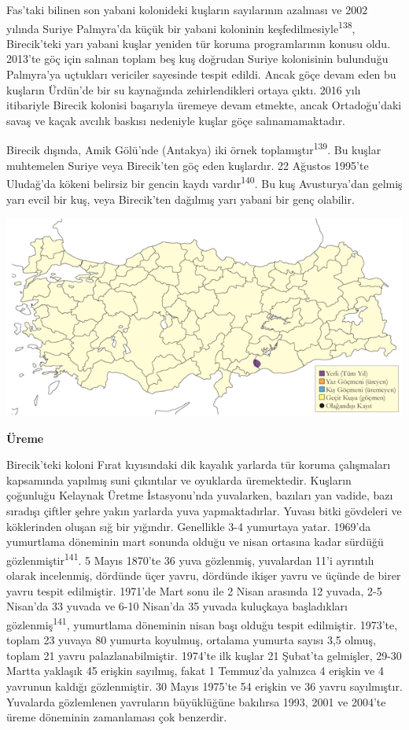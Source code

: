 \documentclass[
  letterpaper,
  DIV=11,
  numbers=noendperiod]{scrreprt}
\begin{document}
Fas'taki bilinen son yabani kolonideki kuşların sayılarının azalması ve
2002 yılında Suriye Palmyra'da küçük bir yabani koloninin
keşfedilmesiyle\textsuperscript{138}, Birecik'teki yarı yabani kuşlar
yeniden tür koruma programlarının konusu oldu. 2013'te göç için salınan
toplam beş kuş doğrudan Suriye kolonisinin bulunduğu Palmyra'ya
uçtukları vericiler sayesinde tespit edildi. Ancak göçe devam eden bu
kuşların Ürdün'de bir su kaynağında zehirlendikleri ortaya çıktı. 2016
yılı itibariyle Birecik kolonisi başarıyla üremeye devam etmekte, ancak
Ortadoğu'daki savaş ve kaçak avcılık baskısı nedeniyle kuşlar göçe
salınamamaktadır.

Birecik dışında, Amik Gölü'nde (Antakya) iki örnek
toplamıştır\textsuperscript{139}. Bu kuşlar muhtemelen Suriye veya
Birecik'ten göç eden kuşlardır. 22 Ağustos 1995'te Uludağ'da kökeni
belirsiz bir gencin kaydı vardır\textsuperscript{140}. Bu kuş
Avusturya'dan gelmiş yarı evcil bir kuş, veya Birecik'ten dağılmış yarı
yabani bir genç olabilir.

\includegraphics{images/harita_Page_061.png}

\textbf{Üreme}

Birecik'teki koloni Fırat kıyısındaki dik kayalık yarlarda tür koruma
çalışmaları kapsamında yapılmış suni çıkıntılar ve oyuklarda
üremektedir. Kuşların çoğunluğu Kelaynak Üretme İstasyonu'nda
yuvalarken, bazıları yan vadide, bazı sıradışı çiftler şehre yakın
yarlarda yuva yapmaktadırlar. Yuvası bitki gövdeleri ve köklerinden
oluşan sığ bir yığındır. Genellikle 3-4 yumurtaya yatar. 1969'da
yumurtlama döneminin mart sonunda olduğu ve nisan ortasına kadar sürdüğü
gözlenmiştir\textsuperscript{141}. 5 Mayıs 1870'te 36 yuva gözlenmiş,
yuvalardan 11'i ayrıntılı olarak incelenmiş, dördünde üçer yavru,
dördünde ikişer yavru ve üçünde de birer yavru tespit edilmiştir.
1971'de Mart sonu ile 2 Nisan arasında 12 yuvada, 2-5 Nisan'da 33 yuvada
ve 6-10 Nisan'da 35 yuvada kuluçkaya başladıkları
gözlenmiş\textsuperscript{141}, yumurtlama döneminin nisan başı olduğu
tespit edilmiştir. 1973'te, toplam 23 yuvaya 80 yumurta koyulmuş,
ortalama yumurta sayısı 3,5 olmuş, toplam 21 yavru palazlanabilmiştir.
1974'te ilk kuşlar 21 Şubat'ta gelmişler, 29-30 Martta yaklaşık 45
erişkin sayılmış, fakat 1 Temmuz'da yalnızca 4 erişkin ve 4 yavrunun
kaldığı gözlenmiştir. 30 Mayıs 1975'te 54 erişkin ve 36 yavru
sayılmıştır. Yuvalarda gözlemlenen yavruların büyüklüğüne bakılırsa
1993, 2001 ve 2004'te üreme döneminin zamanlaması çok benzerdir.
\end{document}
